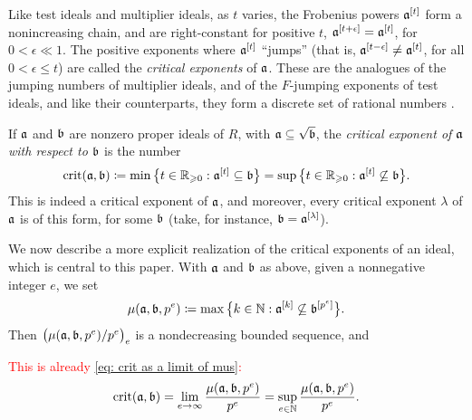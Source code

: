 \documentclass[11pt]{amsart}
\begin{document}
{Like test ideals and multiplier ideals, as $t$ varies, the Frobenius powers $\mathfrak{a}^{[t]}$ form a nonincreasing chain, and are right-constant for positive $t$, \ie $\mathfrak{a}^{[t+\epsilon]} = \mathfrak{a}^{[t]}$, for $0<\epsilon \ll 1$.
The positive exponents where $\mathfrak{a}^{[t]}$ ``jumps'' (that is, $\mathfrak{a}^{[t-\epsilon]}\ne \mathfrak{a}^{[t]}$, for all $0<\epsilon \le t$) are called the \emph{critical exponents} of $\mathfrak{a}$.
These are the analogues of the jumping numbers of multiplier ideals, and of the $F$-jumping exponents of test ideals, and like their counterparts, they form a discrete set of rational numbers \cite[Corollary~5.8]{hernandez+etal.frobenius_powers}.

If $\mathfrak{a}$ and $\mathfrak{b}$ are nonzero proper ideals of $R$, with $\mathfrak{a} \subseteq \sqrt{\mathfrak{b}}$, the \emph{critical exponent of $\mathfrak{a}$ with respect to $\mathfrak{b}$} is the number
\begin{equation}\label{eq: defn of crit(a,b)}
   \operatorname{crit}(\mathfrak{a},\mathfrak{b}) \coloneqq \min\big\{t\in \mathbb{R}_{\geqslant 0}: \mathfrak{a}^{[t]} \subseteq \mathfrak{b}\big\}
      = \sup\big\{t\in \mathbb{R}_{\geqslant 0}: \mathfrak{a}^{[t]} \not\subseteq \mathfrak{b}\big\}.
\end{equation}
This is indeed a critical exponent of $\mathfrak{a}$, and moreover, every critical exponent $\lambda$ of $\mathfrak{a}$ is of this form, for some $\mathfrak{b}$ (take, for instance, $\mathfrak{b} = \mathfrak{a}^{[\lambda]}$).

We now describe a more explicit realization of the critical exponents of an ideal, which is central to this paper.
With $\mathfrak{a}$ and $\mathfrak{b}$ as above, given a nonnegative integer $e$, we set
\[\mu(\mathfrak{a},\mathfrak{b},p^e) \coloneqq \max\big\{k\in \mathbb{N} : \mathfrak{a}^{[k]} \not\subseteq \mathfrak{b}^{[p^e]}\big\}.\]
Then $\big(\mu(\mathfrak{a},\mathfrak{b},p^e)/p^e\big)_e$ is a nondecreasing bounded sequence, and

\textcolor{red}{This is already \eqref{eq: crit as a limit of mus}: 
}
\begin{equation}
   \operatorname{crit}(\mathfrak{a},\mathfrak{b}) = \lim_{e\to \infty} \frac{\mu(\mathfrak{a},\mathfrak{b},p^e)}{p^e} = \sup_{e\in \mathbb{N}} \frac{\mu(\mathfrak{a},\mathfrak{b},p^e)}{p^e}.
\end{equation}

}
\end{document}

